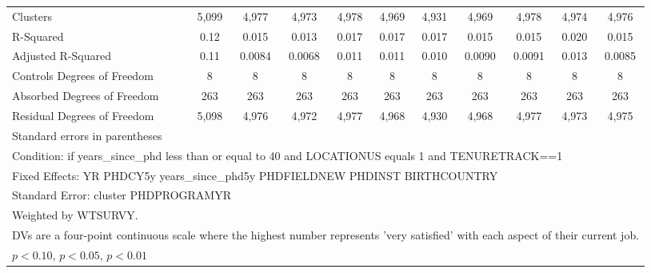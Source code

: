 \begin{table}[htbp]
\begin{tabular}{l*{10}{c}}
Clusters&       5,099         &       4,977         &       4,973         &       4,978         &       4,969         &       4,931         &       4,969         &       4,978         &       4,974         &       4,976         \\
R-Squared&        0.12         &       0.015         &       0.013         &       0.017         &       0.017         &       0.017         &       0.015         &       0.015         &       0.020         &       0.015         \\
Adjusted R-Squared&        0.11         &      0.0084         &      0.0068         &       0.011         &       0.011         &       0.010         &      0.0090         &      0.0091         &       0.013         &      0.0085         \\
Controls Degrees of Freedom&           8         &           8         &           8         &           8         &           8         &           8         &           8         &           8         &           8         &           8         \\
Absorbed Degrees of Freedom&         263         &         263         &         263         &         263         &         263         &         263         &         263         &         263         &         263         &         263         \\
Residual Degrees of Freedom&       5,098         &       4,976         &       4,972         &       4,977         &       4,968         &       4,930         &       4,968         &       4,977         &       4,973         &       4,975         \\
\hline\hline
\multicolumn{11}{l}{\footnotesize Standard errors in parentheses}\\
\multicolumn{11}{l}{\footnotesize Condition: if years\_since\_phd less than or equal to 40 and LOCATIONUS equals 1 and TENURETRACK==1}\\
\multicolumn{11}{l}{\footnotesize Fixed Effects: YR PHDCY5y years\_since\_phd5y PHDFIELDNEW PHDINST BIRTHCOUNTRY}\\
\multicolumn{11}{l}{\footnotesize Standard Error: cluster PHDPROGRAMYR}\\
\multicolumn{11}{l}{\footnotesize Weighted by WTSURVY.}\\
\multicolumn{11}{l}{\footnotesize DVs are a four-point continuous scale where the highest number represents 'very satisfied' with each aspect of their current job.}\\
\multicolumn{11}{l}{\footnotesize \sym{*} \(p<0.10\), \sym{**} \(p<0.05\), \sym{***} \(p<0.01\)}\\
\end{tabular}
\end{table}
